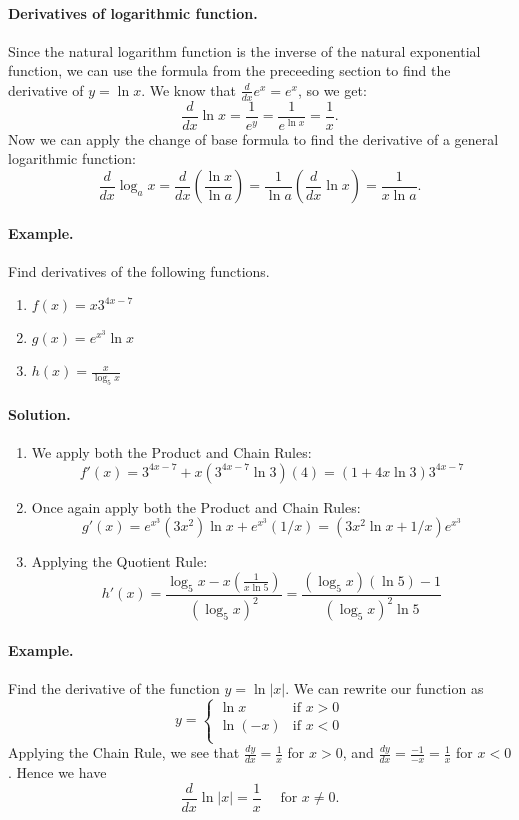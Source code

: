 \documentclass[12pt]{report}
\begin{document}
\paragraph{Derivatives of logarithmic function.} Since the natural logarithm function is the inverse of the natural exponential function, we can use the formula from the preceeding section to find the derivative of $y=\ln x$. We know that $\frac d{dx}e^x=e^x$, so we get: \[\frac{d}{dx}\ln x=\frac 1{e^y}=\frac 1{e^{\ln x}}=\frac1x.\] Now we can apply the change of base formula to find the derivative of a general logarithmic function: \[\frac{d}{dx}\log_ax=\frac{d}{dx}\left(\frac{\ln x}{\ln a}\right) =\frac 1{\ln a}\left(\frac{d}{dx}\ln x\right)=\frac 1{x\ln a}.\]

\paragraph{Example.} Find derivatives of the following functions.
\begin{enumerate}
\item $f(x)=x3^{4x-7}$
\item $g(x)=e^{x^3}\ln x$
\item $h(x)=\frac x{\log_5x}$
\end{enumerate}

\paragraph{Solution.}
\begin{enumerate}
\item We apply both the Product and Chain Rules: \[f'(x)=3^{4x-7}+x\left(3^{4x-7}\ln 3\right)(4)=(1+4x\ln 3)3^{4x-7}\]
\item Once again apply both the Product and Chain Rules: \[g'(x)=e^{x^3}(3x^2)\ln x+e^{x^3}(1/x)=(3x^2\ln x+1/x)e^{x^3}\]
\item Applying the Quotient Rule: \[h'(x)=\frac{\log_5x-x\left(\frac1{x\ln 5}\right)}{(\log_5x)^2}=\frac{(\log_5x)(\ln 5)-1}{(\log_5x)^2\ln 5}\]
\end{enumerate}

\paragraph{Example.} Find the derivative of the function $y=\ln|x|$. We can rewrite our function as \[y=\begin{cases} \ln x & \text{if $x>0$}\\ \ln(-x) & \text{if $x<0$}\\ \end{cases}\]
Applying the Chain Rule, we see that $\frac{dy}{dx}=\frac 1x$ for $x>0$, and $\frac{dy}{dx}=\frac{-1}{-x}=\frac 1x$ for $x<0$. Hence we have \[\frac{d}{dx}\ln |x|=\frac 1x \quad\text{ for $x\neq0$.}\]
\end{document}
